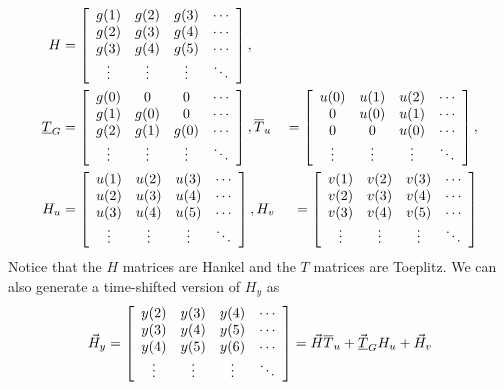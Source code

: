 \begin{align*}
H &= \left[\begin{array}{c c c c}
g(1) & g(2) & g(3) & \cdots \\
g(2) & g(3) & g(4) & \cdots \\
g(3) & g(4) & g(5) & \cdots \\
\vdots & \vdots & \vdots & \ddots
\end{array}\right], \\
\underline{T}_G &= \left[\begin{array}{c c c c}
g(0) & 0 & 0 & \cdots \\
g(1) & g(0) & 0 & \cdots \\
g(2) & g(1) & g(0) & \cdots \\
\vdots & \vdots & \vdots & \ddots
\end{array}\right], \hfill
\overline{T}_u &= \left[\begin{array}{c c c c}
u(0) & u(1) & u(2) & \cdots \\
0 & u(0) & u(1) & \cdots \\
0 & 0 & u(0) & \cdots \\
\vdots & \vdots & \vdots & \ddots
\end{array}\right], \\
H_u &= \left[\begin{array}{c c c c}
u(1) & u(2) & u(3) & \cdots \\
u(2) & u(3) & u(4) & \cdots \\
u(3) & u(4) & u(5) & \cdots \\
\vdots & \vdots & \vdots & \ddots
\end{array}\right], \hfill
H_v &= \left[\begin{array}{c c c c}
v(1) & v(2) & v(3) & \cdots \\
v(2) & v(3) & v(4) & \cdots \\
v(3) & v(4) & v(5) & \cdots \\
\vdots & \vdots & \vdots & \ddots
\end{array}\right]
\end{align*}
Notice that the $H$ matrices are Hankel and the $T$ matrices are Toeplitz. We can also generate a time-shifted version of $H_y$ as
\begin{align*}
\vec{H}_y = \left[\begin{array}{c c c c}
y(2) & y(3) & y(4) & \cdots \\
y(3) & y(4) & y(5) & \cdots \\
y(4) & y(5) & y(6) & \cdots \\
\vdots & \vdots & \vdots & \ddots
\end{array}\right]
= \vec{H}\overline{T}_u + \vec{\underline{T}}_GH_u + \vec{H}_v
\end{align*}


